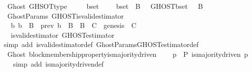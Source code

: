 \begin{isabellebody}
%
\endisatagproof
{\isafoldproof}%
%
\isadelimproof
\isanewline
%
\endisadelimproof
\isanewline
{}\isamarkupfalse%
\ {\isacharparenleft}\ Ghost{\isacharparenright}\ GHSOT{\isacharunderscore}type\ {\isacharcolon}\isanewline
\ \ {\isachardoublequoteopen}{\isasymforall}\ {\isasymsigma}\ b{\isacharunderscore}set{\isachardot}\ {\isasymsigma}\ {\isasymin}\ {\isasymSigma}\ {\isasymand}\ b{\isacharunderscore}set\ {\isasymsubseteq}\ B\ {\isasymlongrightarrow}\ \ GHOST{\isacharparenleft}b{\isacharunderscore}set{\isacharcomma}\ {\isasymsigma}{\isacharparenright}\ {\isasymsubseteq}\ B{\isachardoublequoteclose}\isanewline
%
\isadelimproof
\ \ %
\endisadelimproof
%
\isatagproof
{}\isamarkupfalse%
%
\endisatagproof
{\isafoldproof}%
%
\isadelimproof
\isanewline
%
\endisadelimproof
\isanewline
{}\isamarkupfalse%
\ {\isacharparenleft}\ GhostParams{\isacharparenright}\ GHOST{\isacharunderscore}is{\isacharunderscore}valid{\isacharunderscore}estimator\ {\isacharcolon}\ \isanewline
\ \ {\isachardoublequoteopen}{\isacharparenleft}{\isasymforall}\ b{\isachardot}\ b\ {\isasymin}\ B\ {\isasymlongleftrightarrow}\ prev\ b\ {\isasymin}\ B{\isacharparenright}\ {\isasymand}\ B\ {\isacharequal}\ C\ {\isasymand}\ genesis\ {\isasymin}\ C\ \isanewline
\ \ {\isasymLongrightarrow}\ is{\isacharunderscore}valid{\isacharunderscore}estimator\ GHOST{\isacharunderscore}estimator{\isachardoublequoteclose}\isanewline
%
\isadelimproof
\ \ %
\endisadelimproof
%
\isatagproof
{}\isamarkupfalse%
\ {\isacharparenleft}simp\ add{\isacharcolon}\ is{\isacharunderscore}valid{\isacharunderscore}estimator{\isacharunderscore}def\ GhostParams{\isachardot}GHOST{\isacharunderscore}estimator{\isacharunderscore}def{\isacharparenright}\isanewline
\ \ \isamarkupfalse%
%
\endisatagproof
{\isafoldproof}%
%
\isadelimproof
\isanewline
%
\endisadelimproof
\isanewline
{}\isamarkupfalse%
\ {\isacharparenleft}\ Ghost{\isacharparenright}\ block{\isacharunderscore}membership{\isacharunderscore}property{\isacharunderscore}is{\isacharunderscore}majority{\isacharunderscore}driven\ {\isacharcolon}\isanewline
\ \ {\isachardoublequoteopen}{\isasymforall}\ p\ {\isasymin}\ P{\isachardot}\ is{\isacharunderscore}majority{\isacharunderscore}driven\ p{\isachardoublequoteclose}\isanewline
%
\isadelimproof
\ \ %
\endisadelimproof
%
\isatagproof
{}\isamarkupfalse%
\ {\isacharparenleft}simp\ add{\isacharcolon}\ is{\isacharunderscore}majority{\isacharunderscore}driven{\isacharunderscore}def{\isacharparenright}\isanewline

\end{isabellebody}
